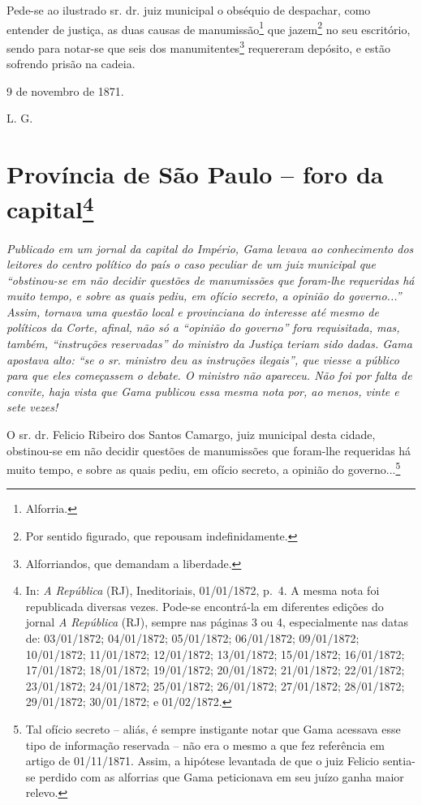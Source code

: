 {Pede-se ao ilustrado sr. dr. juiz municipal o obséquio de despachar,
como entender de justiça, as duas causas de manumissão\footnote{
  Alforria.} que jazem\footnote{ Por sentido figurado, que repousam
  indefinidamente.} no seu escritório, sendo para notar-se que seis dos
manumitentes\footnote{ Alforriandos, que demandam a liberdade.}
requereram depósito, e estão sofrendo prisão na cadeia.

9 de novembro de 1871.

L. G.

\chapter{Província de São Paulo -- foro da capital\footnote{ In: \emph{A República} (RJ), Ineditoriais, 01/01/1872, p.~4.
  A mesma nota foi republicada diversas vezes. Pode-se encontrá-la em
  diferentes edições do jornal \emph{A República} (RJ), sempre nas
  páginas 3 ou 4, especialmente nas datas de: 03/01/1872; 04/01/1872;
  05/01/1872; 06/01/1872; 09/01/1872; 10/01/1872; 11/01/1872;
  12/01/1872; 13/01/1872; 15/01/1872; 16/01/1872; 17/01/1872;
  18/01/1872; 19/01/1872; 20/01/1872; 21/01/1872; 22/01/1872;
  23/01/1872; 24/01/1872; 25/01/1872; 26/01/1872; 27/01/1872;
  28/01/1872; 29/01/1872; 30/01/1872; e 01/02/1872.}} %

\begin{didascalia}
\emph{Publicado em um jornal da capital do Império, Gama levava ao
conhecimento dos leitores do centro político do país o caso peculiar de
um juiz municipal que ``obstinou-se em não decidir questões de
manumissões que foram-lhe requeridas há muito tempo, e sobre as quais
pediu, em ofício secreto, a opinião do governo...'' Assim, tornava uma
questão local e provinciana do interesse até mesmo de políticos da
Corte, afinal, não só a ``opinião do governo'' fora requisitada, mas,
também, ``instruções reservadas'' do ministro da Justiça teriam sido
dadas. Gama apostava alto: ``se o sr. ministro deu as instruções
ilegais'', que viesse a público para que eles começassem o debate. O
ministro não apareceu. Não foi por falta de convite, haja vista que Gama
publicou essa mesma nota por, ao menos, vinte e sete vezes!}
\end{didascalia}

\asterisc{}

O sr. dr. Felicio Ribeiro dos Santos Camargo, juiz municipal desta
cidade, obstinou-se em não decidir questões de manumissões que foram-lhe
requeridas há muito tempo, e sobre as quais pediu, em ofício secreto, a
opinião do governo...\footnote{ Tal ofício secreto -- aliás, é sempre
  instigante notar que Gama acessava esse tipo de informação reservada
  -- não era o mesmo a que fez referência em artigo de 01/11/1871.
  Assim, a hipótese levantada de que o juiz Felicio sentia-se perdido
  com as alforrias que Gama peticionava em seu juízo ganha maior relevo.}

}

